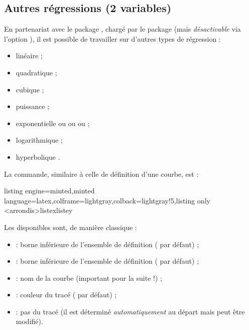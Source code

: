 \documentclass[11pt,a4paper]{ltxdoc}
\begin{document}
\subsection{Autres régressions (2 variables)}\label{regressions}

En partenariat avec le package , chargé par le package (mais \textit{désactivable} via l'option \MontreCode{[nonxintreg]}), il est possible de travailler sur d'autres types de régression :

\begin{itemize}
	\item linéaire  ;
	\item quadratique  ;
	\item cubique  ;
	\item puissance  ;
	\item exponentielle  ou  ou  ou  ;
	\item logarithmique  ;
	\item hyperbolique .
\end{itemize}

La commande, similaire à celle de définition d'une courbe, est :

\begin{tcblisting}{listing engine=minted,minted language=latex,colframe=lightgray,colback=lightgray!5,listing only}
<arrondis>{listex}{listey}
\end{tcblisting}

Les \MontreCode{[clés]} disponibles sont, de manière classique :

\begin{itemize}
	\item {} : borne inférieure de l'ensemble de définition ( par défaut) ;
	\item {} : borne inférieure de l'ensemble de définition ( par défaut) ;
	\item {} : nom de la courbe (important pour la suite !) ;
	\item {} : couleur du tracé ( par défaut) ;
	\item {} : pas du tracé (il est déterminé \textit{automatiquement} au départ mais peut être modifié).
\end{itemize}
\end{document}
